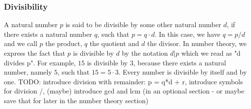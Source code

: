 



\subsubsection{Divisibility}
A natural number $p$ is said to be divisible by some other natural number $d$, if there exists a natural number $q$, such that $p = q \cdot d$. In this case, we have $q = p/d$ and we call $p$ the product, $q$ the quotient and $d$ the divisor. In number theory, we express the fact that $p$ is divisible by $d$ by the notation $d | p$ which we read as "d divides p". For example, $15$ is divisible by $3$, because there exists a natural number, namely $5$, such that $15 = 5 \cdot 3$. Every number is divisible by itself and by one. TODO: introduce division with remainder: p = q*d + r, introduce symbols for division /, (maybe) introduce gcd and lcm (in an optional section - or maybe save that for later in the number theory section)


